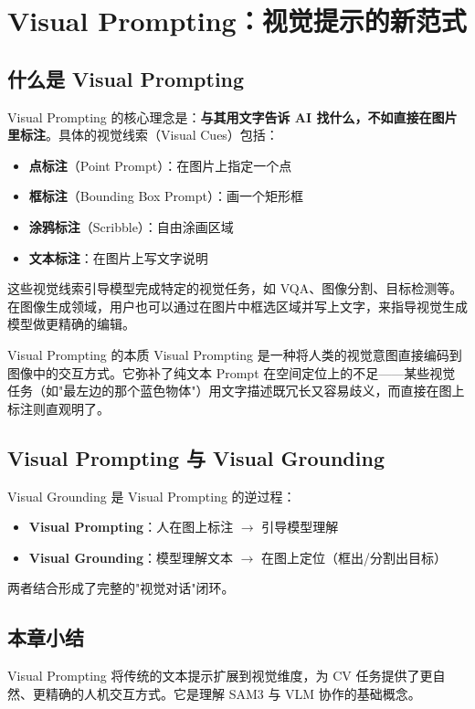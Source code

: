 \section{Visual Prompting：视觉提示的新范式}

\subsection{什么是 Visual Prompting}

Visual Prompting 的核心理念是：\textbf{与其用文字告诉 AI 找什么，不如直接在图片里标注}。具体的视觉线索（Visual Cues）包括：

\begin{itemize}
    \item \textbf{点标注}（Point Prompt）：在图片上指定一个点
    \item \textbf{框标注}（Bounding Box Prompt）：画一个矩形框
    \item \textbf{涂鸦标注}（Scribble）：自由涂画区域
    \item \textbf{文本标注}：在图片上写文字说明
\end{itemize}

这些视觉线索引导模型完成特定的视觉任务，如 VQA、图像分割、目标检测等。在图像生成领域，用户也可以通过在图片中框选区域并写上文字，来指导视觉生成模型做更精确的编辑。

\begin{importantbox}{Visual Prompting 的本质}
Visual Prompting 是一种将人类的视觉意图直接编码到图像中的交互方式。它弥补了纯文本 Prompt 在空间定位上的不足——某些视觉任务（如"最左边的那个蓝色物体"）用文字描述既冗长又容易歧义，而直接在图上标注则直观明了。
\end{importantbox}

\subsection{Visual Prompting 与 Visual Grounding}

Visual Grounding 是 Visual Prompting 的逆过程：
\begin{itemize}
    \item \textbf{Visual Prompting}：人在图上标注 $\rightarrow$ 引导模型理解
    \item \textbf{Visual Grounding}：模型理解文本 $\rightarrow$ 在图上定位（框出/分割出目标）
\end{itemize}

两者结合形成了完整的"视觉对话"闭环。

\subsection{本章小结}

Visual Prompting 将传统的文本提示扩展到视觉维度，为 CV 任务提供了更自然、更精确的人机交互方式。它是理解 SAM3 与 VLM 协作的基础概念。


